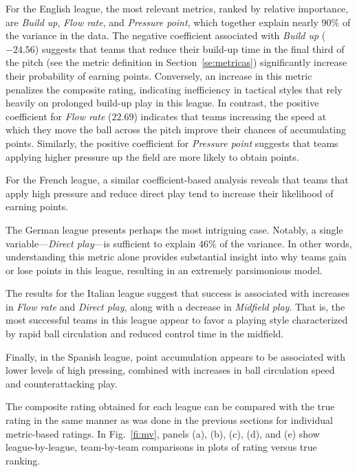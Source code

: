 \documentclass[preprint, amsmath,amssymb, pre]{revtex4-2}
\begin{document}
For the English league, the most relevant metrics, ranked by relative importance, are \textit{Build up}, \textit{Flow rate}, and \textit{Pressure point}, which together explain nearly $90\%$ of the variance in the data. The negative coefficient associated with \textit{Build up} ($-24.56$) suggests that teams that reduce their build-up time in the final third of the pitch (see the metric definition in Section~\ref{se:metricas}) significantly increase their probability of earning points. Conversely, an increase in this metric penalizes the composite rating, indicating inefficiency in tactical styles that rely heavily on prolonged build-up play in this league. In contrast, the positive coefficient for \textit{Flow rate} ($22.69$) indicates that teams increasing the speed at which they move the ball across the pitch improve their chances of accumulating points. Similarly, the positive coefficient for \textit{Pressure point} suggests that teams applying higher pressure up the field are more likely to obtain points.

For the French league, a similar coefficient-based analysis reveals that teams that apply high pressure and reduce direct play tend to increase their likelihood of earning points.

The German league presents perhaps the most intriguing case. Notably, a single variable—\textit{Direct play}—is sufficient to explain $46\%$ of the variance. In other words, understanding this metric alone provides substantial insight into why teams gain or lose points in this league, resulting in an extremely parsimonious model.

The results for the Italian league suggest that success is associated with increases in \textit{Flow rate} and \textit{Direct play}, along with a decrease in \textit{Midfield play}. That is, the most successful teams in this league appear to favor a playing style characterized by rapid ball circulation and reduced control time in the midfield.

Finally, in the Spanish league, point accumulation appears to be associated with lower levels of high pressing, combined with increases in ball circulation speed and counterattacking play.

The composite rating obtained for each league can be compared with the true rating in the same manner as was done in the previous sections for individual metric-based ratings. In Fig.~\ref{fi:mv}, panels (a), (b), (c), (d), and (e) show league-by-league, team-by-team comparisons in plots of rating versus true ranking.
\end{document}
